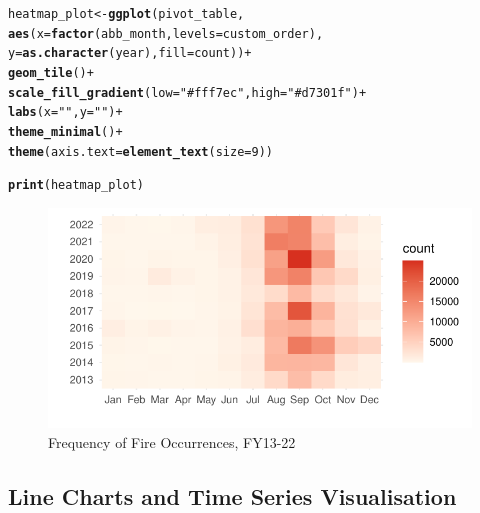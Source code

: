 \documentclass{article}\usepackage[]{graphicx}\usepackage[]{xcolor}
\makeatletter
\def\maxwidth{ %
  \ifdim\Gin@nat@width>\linewidth
    \linewidth
  \else
    \Gin@nat@width
  \fi
}
\newcommand{\hlnum}[1]{\textcolor[rgb]{0.686,0.059,0.569}{#1}}%
\newcommand{\hlstr}[1]{\textcolor[rgb]{0.192,0.494,0.8}{#1}}%
\newcommand{\hlopt}[1]{\textcolor[rgb]{0,0,0}{#1}}%
\newcommand{\hlstd}[1]{\textcolor[rgb]{0.345,0.345,0.345}{#1}}%
\newcommand{\hlkwb}[1]{\textcolor[rgb]{0.69,0.353,0.396}{#1}}%
\newcommand{\hlkwc}[1]{\textcolor[rgb]{0.333,0.667,0.333}{#1}}%
\newcommand{\hlkwd}[1]{\textcolor[rgb]{0.737,0.353,0.396}{\textbf{#1}}}%
\newenvironment{kframe}{%
 \def\at@end@of@kframe{}%
 \ifinner\ifhmode%
  \def\at@end@of@kframe{\end{minipage}}%
  \begin{minipage}{\columnwidth}%
 \fi\fi%
 \def\FrameCommand##1{\hskip\@totalleftmargin \hskip-\fboxsep
 \colorbox{shadecolor}{##1}\hskip-\fboxsep
     \hskip-\linewidth \hskip-\@totalleftmargin \hskip\columnwidth}%
 \MakeFramed {\advance\hsize-\width
   \@totalleftmargin\z@ \linewidth\hsize
   \@setminipage}}%
 {\par\unskip\endMakeFramed%
 \at@end@of@kframe}
\newenvironment{knitrout}{}{} %
\makeatother
\begin{document}
\begin{knitrout}\scriptsize
{}\color{fgcolor}\begin{kframe}
\begin{alltt}
\hlstd{heatmap_plot} \hlkwb{<-} \hlkwd{ggplot}\hlstd{(pivot_table,}
                       \hlkwd{aes}\hlstd{(}\hlkwc{x} \hlstd{=} \hlkwd{factor}\hlstd{(abb_month,} \hlkwc{levels} \hlstd{= custom_order),}
                           \hlkwc{y} \hlstd{=} \hlkwd{as.character}\hlstd{(year),} \hlkwc{fill} \hlstd{= count))} \hlopt{+}
  \hlkwd{geom_tile}\hlstd{()} \hlopt{+}
  \hlkwd{scale_fill_gradient}\hlstd{(}\hlkwc{low} \hlstd{=} \hlstr{"#fff7ec"}\hlstd{,} \hlkwc{high} \hlstd{=} \hlstr{"#d7301f"}\hlstd{)} \hlopt{+}
  \hlkwd{labs}\hlstd{(}\hlkwc{x} \hlstd{=} \hlstr{" "}\hlstd{,} \hlkwc{y} \hlstd{=} \hlstr{" "}\hlstd{)} \hlopt{+}
  \hlkwd{theme_minimal}\hlstd{()} \hlopt{+}
  \hlkwd{theme}\hlstd{(}\hlkwc{axis.text} \hlstd{=} \hlkwd{element_text}\hlstd{(}\hlkwc{size} \hlstd{=} \hlnum{9}\hlstd{))}

\hlkwd{print}\hlstd{(heatmap_plot)}
\end{alltt}
\end{kframe}\begin{figure}[H]

{\centering \includegraphics[width=\maxwidth]{figure/beamer-fire-by-months-fy13-22-1} 

}

\caption[Frequency of Fire Occurrences, FY13-22]{Frequency of Fire Occurrences, FY13-22}\label{fig:fire-by-months-fy13-22}
\end{figure}

\end{knitrout}



\subsection{Line Charts and Time Series Visualisation}
\end{document}
